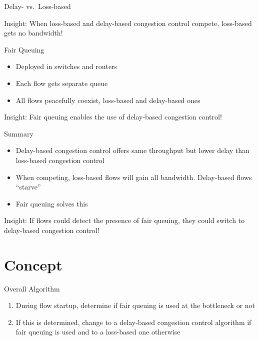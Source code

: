 \documentclass[xcolor={dvipsnames}]{beamer}
\begin{document}
\begin{frame}{Delay- vs.~Loss-based}
\begin{block}{Insight:}
When loss-based and delay-based congestion control compete, loss-based gets no bandwidth!\end{block}
\end{frame}

\begin{frame}{Fair Queuing}
\begin{itemize}
\item Deployed in switches and routers
\item Each flow gets separate queue
\item All flows peacefully coexist, loss-based and delay-based ones
\end{itemize}
\pause
\begin{block}{Insight:}
Fair queuing enables the use of delay-based congestion control!
\end{block}
\end{frame}

\begin{frame}{Summary}
\begin{itemize}
\item Delay-based congestion control offers same throughput but lower delay than loss-based congestion control
\item When competing, loss-based flows will gain all bandwidth. Delay-based flows ``starve''
\item Fair queuing solves this
\end{itemize}
\pause
\begin{block}{Insight:}
If flows could detect the presence of fair queuing, they could switch to delay-based congestion control!
\end{block}
\end{frame}

\section{Concept}
\begin{frame}{Overall Algorithm}
\begin{enumerate}
\item During flow startup, determine if fair queuing is used at the bottleneck or not
\item If this is determined, change to a delay-based congestion control algorithm if fair queuing is used and to a loss-based one otherwise
\end{enumerate}
\end{frame}
\end{document}
